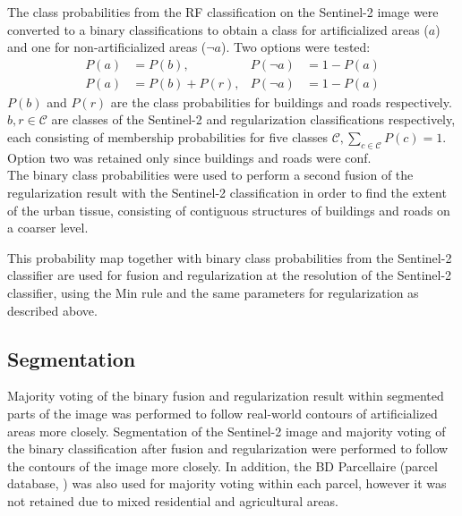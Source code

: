 \documentclass[10pt]{article}
\begin{document}
The class probabilities from the RF classification on the Sentinel-2 image were converted to a binary classifications to obtain a class for artificialized areas ($a$) and one for non-artificialized areas ($\neg a$). Two options were tested:
\begin{align}
    P(a)&=P(b),  &P(\neg a)&= 1 - P(a)\label{eq:bin1}\\
    P(a)&=P(b)+P(r),  &P(\neg a)&= 1 - P(a)\label{eq:bin2}
\end{align}
$P(b)$ and $P(r)$ are the class probabilities for buildings and roads respectively. $b, r\in \mathcal{C}$ are classes of the Sentinel-2 and regularization classifications respectively, each consisting of membership probabilities for five classes $\mathcal{C}, \sum_{c \in \mathcal{C}}P(c) = 1$. Option two was retained only since buildings and roads were conf.\\

The binary class probabilities were used to perform a second fusion of the regularization result with the Sentinel-2 classification in order to find the extent of the urban tissue, consisting of contiguous structures of buildings and roads on a coarser level. 

This probability map together with binary class probabilities from the Sentinel-2 classifier are used for fusion and regularization at the resolution of the Sentinel-2 classifier, using the Min rule and the same parameters for regularization as described above.\\

\subsection{Segmentation}
Majority voting of the binary fusion and regularization result within segmented parts of the image was performed to follow real-world contours of artificialized areas more closely. Segmentation of the Sentinel-2 image and majority voting of the binary classification after fusion and regularization were performed to follow the contours of the image more closely. In addition, the BD Parcellaire (parcel database, \cite{bdparcellaire}) was also used for majority voting within each parcel, however it was not retained due to mixed residential and agricultural areas. \\
\end{document}
